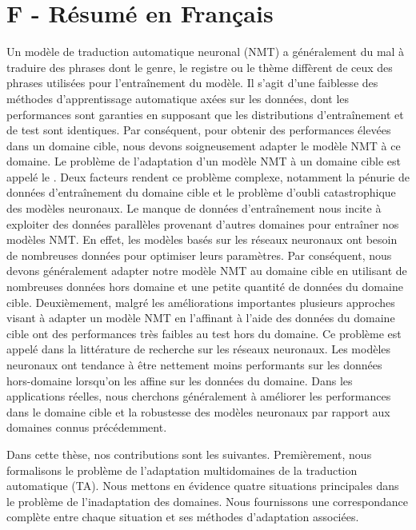 \chapter{F - Résumé en Français}

Un modèle de traduction automatique neuronal (NMT) a généralement du mal à traduire des phrases dont le genre, le registre ou le thème diffèrent de ceux des phrases utilisées pour l'entraînement du modèle. Il s'agit d'une faiblesse des méthodes d'apprentissage automatique axées sur les données, dont les performances sont garanties en supposant que les distributions d'entraînement et de test sont identiques. Par conséquent, pour obtenir des performances élevées dans un domaine cible, nous devons soigneusement adapter le modèle NMT à ce domaine. Le problème de l'adaptation d'un modèle NMT à un domaine cible est appelé le . Deux facteurs rendent ce problème complexe, notamment la pénurie de données d'entraînement du domaine cible et le problème d'oubli catastrophique des modèles neuronaux. Le manque de données d'entraînement nous incite à exploiter des données parallèles provenant d'autres domaines pour entraîner nos modèles NMT. En effet, les modèles basés sur les réseaux neuronaux ont besoin de nombreuses données pour optimiser leurs paramètres. Par conséquent, nous devons généralement adapter notre modèle NMT au domaine cible en utilisant de nombreuses données hors domaine et une petite quantité de données du domaine cible. Deuxièmement, malgré les améliorations importantes plusieurs approches visant à adapter un modèle NMT en l'affinant à l'aide des données du domaine cible ont des performances très faibles au test hors du domaine. Ce problème est appelé  dans la littérature de recherche sur les réseaux neuronaux. Les modèles neuronaux ont tendance à être nettement moins performants sur les données hors-domaine lorsqu'on les affine sur les données du domaine. Dans les applications réelles, nous cherchons généralement à améliorer les performances dans le domaine cible et la robustesse des modèles neuronaux par rapport aux domaines connus précédemment.

Dans cette thèse, nos contributions sont les suivantes. Premièrement, nous formalisons le problème de l'adaptation multidomaines de la traduction automatique (TA). Nous mettons en évidence quatre situations principales dans le problème de l'inadaptation des domaines. Nous fournissons une correspondance complète entre chaque situation et ses méthodes d'adaptation associées.


